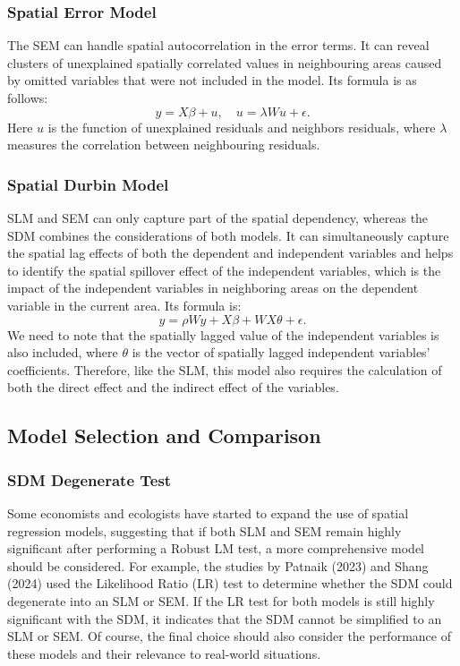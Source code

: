 \subsubsection{Spatial Error Model}
\label{sec:3.4.4.2}
The SEM can handle spatial autocorrelation in the error terms. It can reveal clusters of unexplained spatially correlated values in neighbouring areas caused by omitted variables that were not included in the model. Its formula is as follows:
\begin{equation}
y=X \beta+u, \quad u=\lambda W u+\epsilon.
\end{equation}
Here $u$ is the function of unexplained residuals and neighbors residuals, where $\lambda$ measures the correlation between neighbouring residuals.
\subsubsection{Spatial Durbin Model}
\label{sec:3.4.4.3}
SLM and SEM can only capture part of the spatial dependency, whereas the SDM combines the considerations of both models. It can simultaneously capture the spatial lag effects of both the dependent and independent variables and helps to identify the spatial spillover effect of the independent variables, which is the impact of the independent variables in neighboring areas on the dependent variable in the current area. Its formula is:
\begin{equation}
y=\rho W y+X \beta+W X \theta+\epsilon.
\end{equation}
We need to note that the spatially lagged value of the independent variables is also included, where $\theta$ is the vector of spatially lagged independent variables' coefficients. Therefore, like the SLM, this model also requires the calculation of both the direct effect and the indirect effect of the variables.

\subsection{Model Selection and Comparison}
\label{sec:3.4.5}
\subsubsection{SDM Degenerate Test}
\label{sec:3.4.5.1}
Some economists and ecologists have started to expand the use of spatial regression models, suggesting that if both SLM and SEM remain highly significant after performing a Robust LM test, a more comprehensive model should be considered. For example, the studies by Patnaik (2023) and Shang (2024) used the Likelihood Ratio (LR) test to determine whether the SDM could degenerate into an SLM or SEM. If the LR test for both models is still highly significant with the SDM, it indicates that the SDM cannot be simplified to an SLM or SEM. Of course, the final choice should also consider the performance of these models and their relevance to real-world situations.
